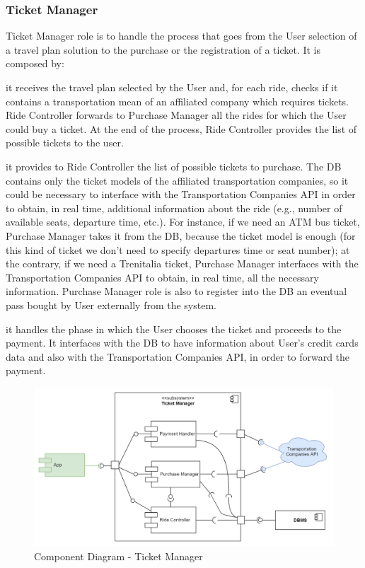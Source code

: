 	\filbreak
	\subsubsection{Ticket Manager}
		\label{sect:TicketManager}
		Ticket Manager role is to handle the process that goes from the User selection of a travel plan solution to the purchase or the registration of a ticket.\newline
		It is composed by:
		\begin{description}[before={\renewcommand{\makelabel}[1]{-- \textit{##1}:}}]
			\item[Ride Controller] it receives the travel plan selected by the User and, for each ride, checks if it contains a transportation mean of an affiliated company which requires tickets. Ride Controller forwards to Purchase Manager all the rides for which the User could buy a ticket. At the end of the process, Ride Controller provides the list of possible tickets to the user.
			\item[Purchase Manager] it provides to Ride Controller the list of possible tickets to purchase. The DB contains only the ticket models of the affiliated transportation companies, so it could be necessary to interface with the Transportation Companies API in order to obtain, in real time, additional information about the ride (e.g., number of available seats, departure time, etc.). For instance, if we need an ATM bus ticket, Purchase Manager takes it from the DB, because the ticket model is enough (for this kind of ticket we don't need to specify departures time or seat number); at the contrary, if we need a Trenitalia ticket, Purchase Manager interfaces with the Transportation Companies API to obtain, in real time, all the necessary information. \newline
			Purchase Manager role is also to register into the DB an eventual pass bought by User externally from the system.
			\item[Payment Handler] it handles the phase in which the User chooses the ticket and proceeds to the payment. It interfaces with the DB to have information about User's credit cards data and also with the Transportation Companies API, in order to forward the payment.  
		\end{description}

		\begin{figure}[H]
			\centerline{\includegraphics[width=0.9\paperwidth]{Images/CD_TicketManager}}
			\caption{Component Diagram - Ticket Manager}
		\end{figure}


